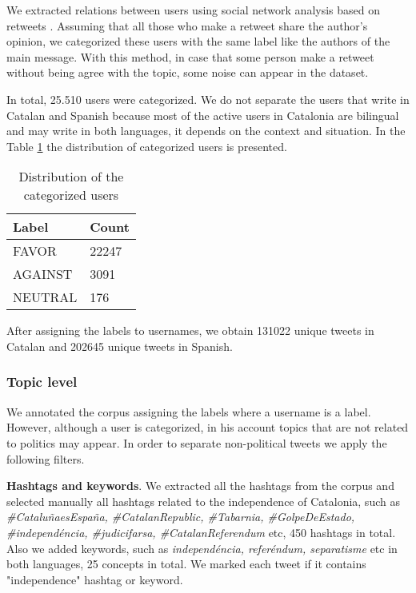 \documentclass[10pt, a4paper]{article}
\begin{document}
We extracted relations between users using social network analysis based on retweets \cite{SNA2002}. Assuming that all those who make a retweet share the author's opinion, we categorized these users with the same label like the authors of the main message. With this method, in case that some person make a retweet without being agree with the topic, some noise can appear in the dataset.  

In total, 25.510 users were categorized. We do not separate the users that write in Catalan and Spanish because most of the  active users in Catalonia are bilingual and may write in both languages, it depends on the context and situation. In the Table \ref{table:users} the distribution of categorized users is presented. 

\begin{table}[!h]
\begin{center}
\begin{tabularx}{\columnwidth}{|l|X|}

      \hline
      Label&Count\\
      \hline
      FAVOR & 22247 \\
      \hline
      AGAINST & 3091\\
      \hline
     NEUTRAL & 176\\
      \hline

\end{tabularx}
\caption{Distribution of the categorized users}
\label{table:users}
 \end{center}
\end{table}

After assigning the labels to usernames, we obtain 131022 unique tweets in Catalan and 202645 unique tweets in Spanish. 

\subsubsection{Topic level} 

We annotated the corpus assigning the labels where a username is a label. However, although a user is categorized, in his account topics that are not related to politics may appear. In order to separate non-political tweets we apply the following filters. 

\textbf{Hashtags and keywords}. We extracted all the hashtags from the corpus and selected manually all hashtags related to the independence of Catalonia, such as \textit{\#Catalu\~naesEspa\~na, \#CatalanRepublic, \#Tabarnia, \#GolpeDeEstado, \#independ\'encia, \#judicifarsa, \#CatalanReferendum} etc, 450 hashtags in total. Also we added keywords, such as \textit{independ\'encia, refer\'endum, separatisme} etc in both languages, 25 concepts in total. We marked each tweet if it contains "independence" hashtag or keyword. 
\end{document}
